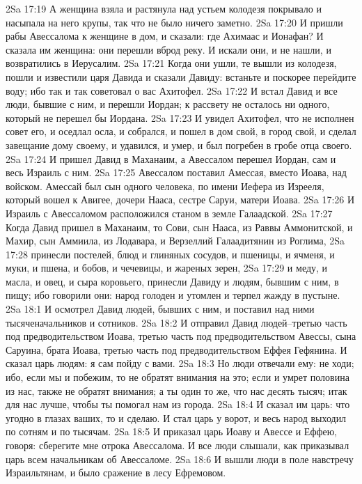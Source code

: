 2Sa 17:19  А женщина взяла и растянула над устьем колодезя покрывало и насыпала на него крупы, так что не было ничего заметно.
2Sa 17:20  И пришли рабы Авессалома к женщине в дом, и сказали: где Ахимаас и Ионафан? И сказала им женщина: они перешли вброд реку. И искали они, и не нашли, и возвратились в Иерусалим.
2Sa 17:21  Когда они ушли, те вышли из колодезя, пошли и известили царя Давида и сказали Давиду: встаньте и поскорее перейдите воду; ибо так и так советовал о вас Ахитофел.
2Sa 17:22  И встал Давид и все люди, бывшие с ним, и перешли Иордан; к рассвету не осталось ни одного, который не перешел бы Иордана.
2Sa 17:23  И увидел Ахитофел, что не исполнен совет его, и оседлал осла, и собрался, и пошел в дом свой, в город свой, и сделал завещание дому своему, и удавился, и умер, и был погребен в гробе отца своего.
2Sa 17:24  И пришел Давид в Маханаим, а Авессалом перешел Иордан, сам и весь Израиль с ним.
2Sa 17:25  Авессалом поставил Амессая, вместо Иоава, над войском. Амессай был сын одного человека, по имени Иефера из Изрееля, который вошел к Авигее, дочери Нааса, сестре Саруи, матери Иоава.
2Sa 17:26  И Израиль с Авессаломом расположился станом в земле Галаадской.
2Sa 17:27  Когда Давид пришел в Маханаим, то Сови, сын Нааса, из Раввы Аммонитской, и Махир, сын Аммиила, из Лодавара, и Верзеллий Галаадитянин из Роглима,
2Sa 17:28  принесли постелей, блюд и глиняных сосудов, и пшеницы, и ячменя, и муки, и пшена, и бобов, и чечевицы, и жареных зерен,
2Sa 17:29  и меду, и масла, и овец, и сыра коровьего, принесли Давиду и людям, бывшим с ним, в пищу; ибо говорили они: народ голоден и утомлен и терпел жажду в пустыне.
2Sa 18:1  И осмотрел Давид людей, бывших с ним, и поставил над ними тысяченачальников и сотников.
2Sa 18:2  И отправил Давид людей--третью часть под предводительством Иоава, третью часть под предводительством Авессы, сына Саруина, брата Иоава, третью часть под предводительством Еффея Гефянина. И сказал царь людям: я сам пойду с вами.
2Sa 18:3  Но люди отвечали ему: не ходи; ибо, если мы и побежим, то не обратят внимания на это; если и умрет половина из нас, также не обратят внимания; а ты один то же, что нас десять тысяч; итак для нас лучше, чтобы ты помогал нам из города.
2Sa 18:4  И сказал им царь: что угодно в глазах ваших, то и сделаю. И стал царь у ворот, и весь народ выходил по сотням и по тысячам.
2Sa 18:5  И приказал царь Иоаву и Авессе и Еффею, говоря: сберегите мне отрока Авессалома. И все люди слышали, как приказывал царь всем начальникам об Авессаломе.
2Sa 18:6  И вышли люди в поле навстречу Израильтянам, и было сражение в лесу Ефремовом.

